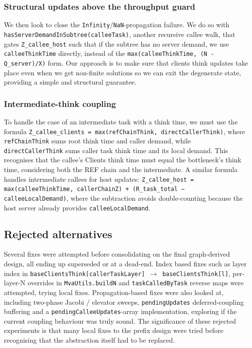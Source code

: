 \subsubsection*{Structural updates above the throughput guard}

We then look to close the \texttt{Infinity}/\texttt{NaN}-propagation failure. We do so with \texttt{hasServerDemandInSubtree(calleeTask)}, another recursive callee walk, that gates \texttt{Z\_callee\_host} such that if the subtree has no server demand, we use \texttt{calleeThinkTime} directly, instead of the \texttt{max(calleeThinkTime, (N - Q\_server)/X)} form. Our approach is to make sure that clients think updates take place even when we get non-finite solutions so we can exit the degenerate state, providing a simple and structural guarantee.

\subsubsection*{Intermediate-think coupling}

To handle the case of an intermediate task with a think time, we must use the formula \texttt{Z\_callee\_clients = max(refChainThink, directCallerThink)}, where \texttt{refChainThink} sums root think time and caller demand, while \texttt{directCallerThink} sums caller task think time and its local demand. This recognises that the callee's Clients think time must equal the bottleneck's think time, considering both the REF chain and the intermediate. A similar formula handles intermediate callees for host updates: \texttt{Z\_callee\_host = max(calleeThinkTime, callerChainZ) + (R\_task\_total − calleeLocalDemand)}, where the subtraction avoids double-counting because the host server already provides \texttt{calleeLocalDemand}.

\subsection{Rejected alternatives}

Several fixes were attempted before consolidating on the final graph-derived design, all ending up superseded or at a dead-end. Index based fixes such as layer index in \texttt{baseClientsThink[callerTaskLayer] $\rightarrow$ baseClientsThink[l]}, per-layer-N overrides in \texttt{MvaUtils.buildN} and \texttt{taskCalledByTask} reverse maps were attempted, trying local fixes. Propagation-based fixes were also looked at, including two-phase Jacobi / elevator sweeps, \texttt{pendingUpdates} deferred-coupling buffering and a \texttt{pendingCalleeUpdates}-array implementation, exploring if the current coupling behaviour was truly sound. The significance of these rejected experiments is that many local fixes to the prefix design were tried before recognising that the abstraction itself had to be replaced.

